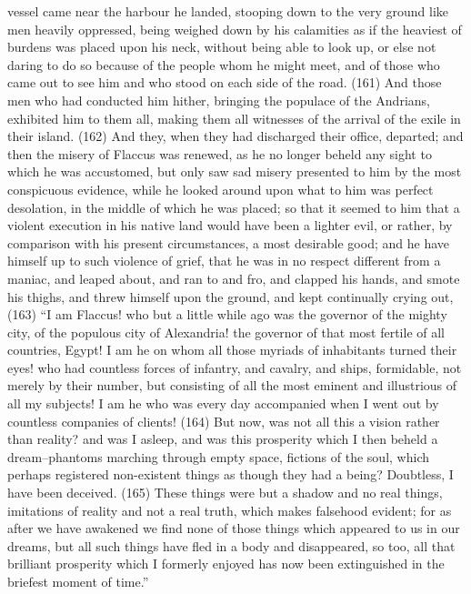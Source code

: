 vessel came near the harbour he landed, stooping down to the very ground like men heavily
oppressed, being weighed down by his calamities as if the heaviest of burdens was placed upon
his neck, without being able to look up, or else not daring to do so because of the people whom he
might meet, and of those who came out to see him and who stood on each side of the road. (161)
And those men who had conducted him hither, bringing the populace of the Andrians, exhibited him
to them all, making them all witnesses of the arrival of the exile in their island. (162) And they, when
they had discharged their office, departed; and then the misery of Flaccus was renewed, as he no
longer beheld any sight to which he was accustomed, but only saw sad misery presented to him by
the most conspicuous evidence, while he looked around upon what to him was perfect desolation,
in the middle of which he was placed; so that it seemed to him that a violent execution in his native
land would have been a lighter evil, or rather, by comparison with his present circumstances, a
most desirable good; and he have himself up to such violence of grief, that he was in no respect
different from a maniac, and leaped about, and ran to and fro, and clapped his hands, and smote
his thighs, and threw himself upon the ground, and kept continually crying out, (163) ``I am Flaccus!
who but a little while ago was the governor of the mighty city, of the populous city of Alexandria! the
governor of that most fertile of all countries, Egypt! I am he on whom all those myriads of
inhabitants turned their eyes! who had countless forces of infantry, and cavalry, and ships,
formidable, not merely by their number, but consisting of all the most eminent and illustrious of all
my subjects! I am he who was every day accompanied when I went out by countless companies of
clients! (164) But now, was not all this a vision rather than reality? and was I asleep, and was this
prosperity which I then beheld a dream--phantoms marching through empty space, fictions of the
soul, which perhaps registered non-existent things as though they had a being? Doubtless, I have
been deceived. (165) These things were but a shadow and no real things, imitations of reality and
not a real truth, which makes falsehood evident; for as after we have awakened we find none of
those things which appeared to us in our dreams, but all such things have fled in a body and
disappeared, so too, all that brilliant prosperity which I formerly enjoyed has now been extinguished
in the briefest moment of time.''

